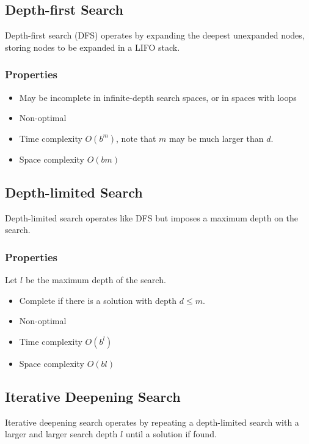 \documentclass[12pt,titlepage]{article}
\begin{document}
    \subsection{Depth-first Search}
      Depth-first search (DFS) operates by expanding the deepest unexpanded nodes, storing nodes to be expanded in a LIFO stack.

      \subsubsection{Properties}
        \begin{itemize}
          \item May be incomplete in infinite-depth search spaces, or in spaces with loops
          \item Non-optimal
          \item Time complexity $O(b^m)$, note that $m$ may be much larger than $d$.
          \item Space complexity $O(bm)$
        \end{itemize}

    \subsection{Depth-limited Search}
      Depth-limited search operates like DFS but imposes a maximum depth on the search.

      \subsubsection{Properties}
        Let $l$ be the maximum depth of the search.
        \begin{itemize}
          \item Complete if there is a solution with depth $d \leq m$.
          \item Non-optimal
          \item Time complexity $O(b^l)$
          \item Space complexity $O(bl)$
        \end{itemize}

    \subsection{Iterative Deepening Search}
      Iterative deepening search operates by repeating a depth-limited search with a larger and larger
      search depth $l$ until a solution if found.
\end{document}
